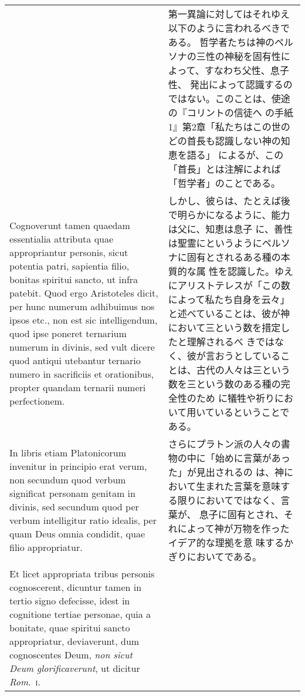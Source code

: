 \documentclass[10pt]{jsarticle} %
\begin{document}
\begin{longtable}{p{21em}p{21em}}
&

第一異論に対してはそれゆえ以下のように言われるべきである。
哲学者たちは神のペルソナの三性の神秘を固有性によって、すなわち父性、息子性、
 発出によって認識するのではない。このことは、使途の『コリントの信徒へ
 の手紙1』第2章「私たちはこの世のどの首長も認識しない神の知恵を語る」
 によるが、この「首長」とは注解によれば「哲学者」のことである。


\\


Cognoverunt tamen quaedam essentialia
attributa quae appropriantur personis, sicut potentia patri, sapientia
filio, bonitas spiritui sancto, ut infra patebit. Quod ergo
Aristoteles dicit, per hunc numerum adhibuimus nos ipsos etc., non est
sic intelligendum, quod ipse poneret ternarium numerum in divinis, sed
vult dicere quod antiqui utebantur ternario numero in sacrificiis et
orationibus, propter quandam ternarii numeri perfectionem. 


&

しかし、彼らは、たとえば後で明らかになるように、能力は父に、知恵は息子
 に、善性は聖霊にというようにペルソナに固有とされるある種の本質的な属
 性を認識した。ゆえにアリストテレスが「この数によって私たち自身を云々」
 と述べていることは、彼が神において三という数を措定したと理解されるべ
 きではなく、彼が言おうとしていることは、古代の人々は三という数を三という数のある種の完全性のため
 に犠牲や祈りにおいて用いているということである。



\\


In libris
etiam Platonicorum invenitur in principio erat verum, non secundum
quod verbum significat personam genitam in divinis, sed secundum quod
per verbum intelligitur ratio idealis, per quam Deus omnia condidit,
quae filio appropriatur. 


&

さらにプラトン派の人々の書物の中に「始めに言葉があった」が見出されるの
 は、神において生まれた言葉を意味する限りにおいてではなく、言葉が、
息子に固有とされ、それによって神が万物を作ったイデア的な理拠を意
 味するかぎりにおいてである。


\\


Et licet appropriata tribus personis
cognoscerent, dicuntur tamen in tertio signo defecisse, idest in
cognitione tertiae personae, quia a bonitate, quae spiritui sancto
appropriatur, deviaverunt, dum cognoscentes Deum, {\itshape non sicut Deum
glorificaverunt}, ut dicitur {\itshape Rom}.~{\scshape i}. 



\end{longtable}
\end{document}
